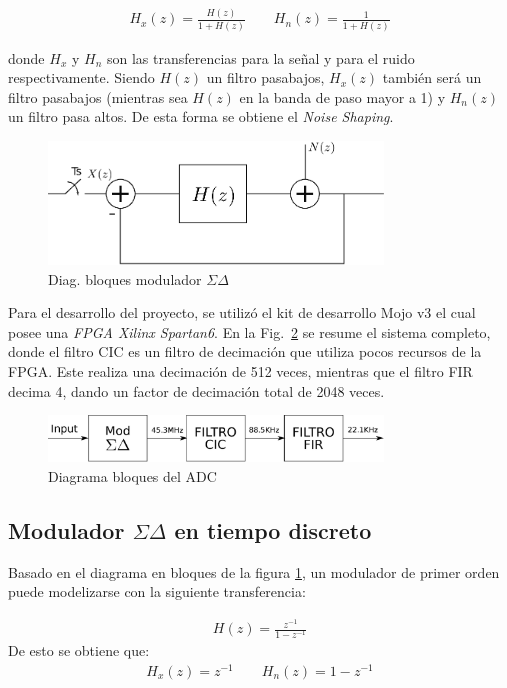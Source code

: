 \documentclass[a4paper,conference]{IEEEtran}
\begin{document}
\begin{align}
H_x(z)=\frac{H(z)}{1+H(z)} \qquad
H_n(z)=\frac{1}{1+H(z)}
\end{align}

donde $H_x$ y $H_n$ son las transferencias para la señal y para el ruido respectivamente. Siendo $H(z)$ un filtro pasabajos, $H_x(z)$ también será un filtro pasabajos (mientras sea $H(z)$ en la banda de paso mayor a 1) y $H_n(z)$ un filtro pasa altos. De esta forma se obtiene el \textit{Noise Shaping}.

\begin{figure}[!t]
\centering
\includegraphics[width=3.5in]{Sigma-Delta_Tiempo_Discreto.eps}
\caption{Diag. bloques modulador $\Sigma\Delta$}
\label{fig:SDTD}
\end{figure}

Para el desarrollo del proyecto, se utilizó el kit de desarrollo Mojo v3 el cual posee una \textit{FPGA Xilinx Spartan6}. En la Fig.~\ref{fig:DBADC} se resume el sistema completo, donde el filtro CIC es un filtro de decimación que utiliza pocos recursos de la FPGA. Este realiza una decimación de 512 veces, mientras que el filtro FIR decima 4, dando un factor de decimación total de 2048 veces.

\begin{figure}[!t]
\centering
\includegraphics[width=3.5in]{Diagrama_Sistema_ADC.eps}
\caption{Diagrama bloques del ADC}
\label{fig:DBADC}
\end{figure}

\subsection{Modulador $\Sigma\Delta$ en tiempo discreto}
Basado en el diagrama en bloques de la figura \ref{fig:SDTD}, un modulador de primer orden puede modelizarse con la siguiente transferencia:

\begin{align}
H(z)=\frac{z^{-1}}{1-z^{-1}}
\end{align}
De esto se obtiene que:
\begin{align}
H_x(z)=z^{-1} \qquad
H_n(z)=1-z^{-1}
\end{align}
\end{document}
